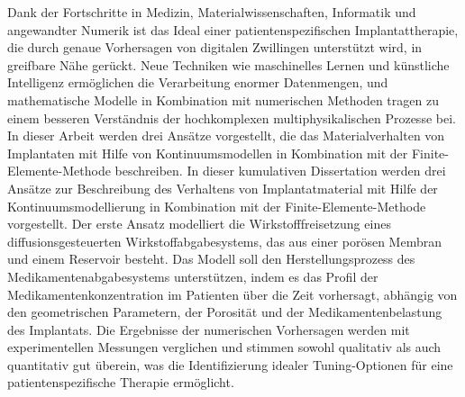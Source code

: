 Dank der Fortschritte in Medizin, Materialwissenschaften, Informatik und angewandter Numerik ist das Ideal einer patientenspezifischen Implantattherapie, die durch genaue Vorhersagen von digitalen Zwillingen unterstützt wird, in greifbare Nähe gerückt. Neue Techniken wie maschinelles Lernen und künstliche Intelligenz ermöglichen die Verarbeitung enormer Datenmengen, und mathematische Modelle in Kombination mit numerischen Methoden tragen zu einem besseren Verständnis der hochkomplexen multiphysikalischen Prozesse bei. In dieser Arbeit werden drei Ansätze vorgestellt, die das Materialverhalten von Implantaten mit Hilfe von Kontinuumsmodellen in Kombination mit der Finite-Elemente-Methode beschreiben. In dieser kumulativen Dissertation werden drei Ansätze zur Beschreibung des Verhaltens von Implantatmaterial mit Hilfe der Kontinuumsmodellierung in Kombination mit der Finite-Elemente-Methode vorgestellt. Der erste Ansatz modelliert die Wirkstofffreisetzung eines diffusionsgesteuerten Wirkstoffabgabesystems, das aus einer porösen Membran und einem Reservoir besteht. Das Modell soll den Herstellungsprozess des Medikamentenabgabesystems unterstützen, indem es das Profil der Medikamentenkonzentration im Patienten über die Zeit vorhersagt, abhängig von den geometrischen Parametern, der Porosität und der Medikamentenbelastung des Implantats. Die Ergebnisse der numerischen Vorhersagen werden mit experimentellen Messungen verglichen und stimmen sowohl qualitativ als auch quantitativ gut überein, was die Identifizierung idealer Tuning-Optionen für eine patientenspezifische Therapie ermöglicht. 